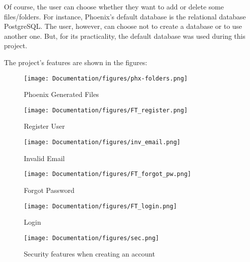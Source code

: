 Of course, the user can choose whether they want to add or delete some files/folders. For instance, Phoenix's default database is the relational database PostgreSQL. The user, however, can choose not to create a database or to use another one. But, for its practicality, the default database was used during this project.\newline

The project's features are shown in the figures:

\begin{figure}[htbp]
	\centering
	\texttt{[image: Documentation/figures/phx-folders.png]}  %
	\caption{Phoenix Generated Files}
	\label{fig:phx}
\end{figure}



\begin{figure}[htbp]
	\centering
	
	\begin{minipage}[b]{0.45\textwidth}
		\centering
		\texttt{[image: Documentation/figures/FT\_register.png]}
		\caption{Register User}
		\label{fig:register}
	\end{minipage}
	\hfill
	\begin{minipage}[b]{0.45\textwidth}
		\centering
		\texttt{[image: Documentation/figures/inv\_email.png]}
		\caption{Invalid Email}
		\label{fig:inv}
	\end{minipage}

\end{figure}

\begin{figure}[htbp]
	\centering
	
	\begin{minipage}[b]{0.45\textwidth}
		\centering
		\texttt{[image: Documentation/figures/FT\_forgot\_pw.png]}
		\caption{Forgot Password}
		\label{fig:pw}
	\end{minipage}
	\hfill
	\begin{minipage}[b]{0.45\textwidth}
		\centering
		\texttt{[image: Documentation/figures/FT\_login.png]}
		\caption{Login}
		\label{fig:login}
	\end{minipage}

\end{figure}

\begin{figure}[htbp]
	\centering
	\texttt{[image: Documentation/figures/sec.png]}  %
	\caption{Security features when creating an account}
	\label{fig:sec}
\end{figure}


